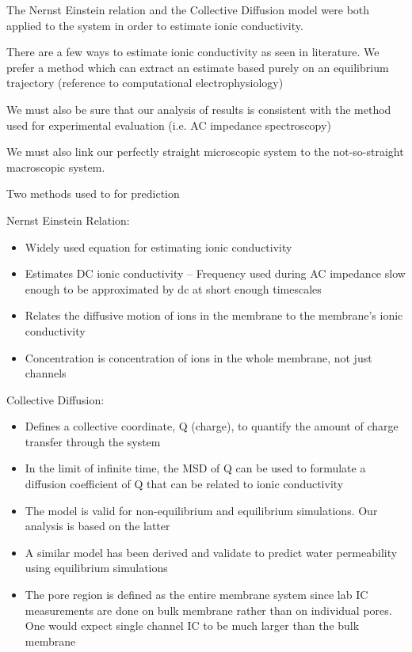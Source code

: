 \documentclass{article}
\begin{document}
	The Nernst Einstein relation and the Collective Diffusion model were both applied to the system in order to estimate ionic conductivity.
		\item There are a few ways to estimate ionic conductivity as seen in literature. We prefer a method which can extract an estimate based purely on an equilibrium trajectory (reference to computational electrophysiology) 
                \item We must also be sure that our analysis of results is consistent with the method used for experimental evaluation (i.e. AC impedance spectroscopy)
                \item We must also link our perfectly straight microscopic system to the not-so-straight macroscopic system. %
                \item Two methods used to for prediction
                \item Nernst Einstein Relation:
                \begin{itemize}
                        \item Widely used equation for estimating ionic conductivity
                        \item Estimates DC ionic conductivity -- Frequency used during AC impedance slow enough to be approximated by dc at short enough timescales
                        \item Relates the diffusive motion of ions in the membrane to the membrane's ionic conductivity
                        \item Concentration is concentration of ions in the whole membrane, not just channels
                \end{itemize}
                \item Collective Diffusion:  %
                \begin{itemize}
                        \item Defines a collective coordinate, Q (charge), to quantify the amount of charge transfer through the system
                        \item In the limit of infinite time, the MSD of Q can be used to formulate a diffusion coefficient of Q that can be related to ionic conductivity
                        \item The model is valid for non-equilibrium and equilibrium simulations. Our analysis is based on the latter
                        \item A similar model has been derived and validate to predict water permeability using equilibrium simulations
                        \item The pore region is defined as the entire membrane system since lab IC measurements are done on bulk membrane rather than on individual pores. One would expect single channel IC to be much larger than the bulk membrane
                \end{itemize}
\end{document}
